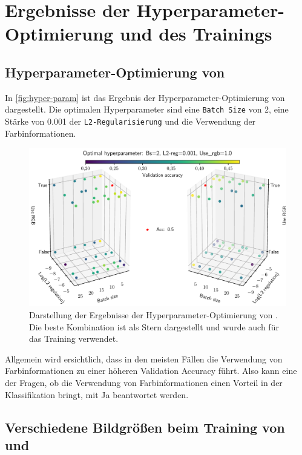 \section{Ergebnisse der Hyperparameter-Optimierung und des Trainings}
\subsection{Hyperparameter-Optimierung von \MiniDog}

In \autoref{fig:hyper-param} ist das Ergebnis der Hyperparameter-Optimierung von \MiniDog
dargestellt. Die optimalen Hyperparameter sind eine \texttt{Batch Size} von 2,
eine Stärke von 0.001 der \texttt{L2-Regularisierung} und die Verwendung
der Farbinformationen.

\begin{figure}
  \centering
  \includegraphics[width=\textwidth]{pics/ergebnisse/hyper_raum.pdf}
  \caption{Darstellung der Ergebnisse der Hyperparameter-Optimierung
  von \MiniDog. Die beste Kombination ist als Stern dargestellt und wurde auch
  für das Training verwendet.}
  \label{fig:hyper-param}
\end{figure}

Allgemein wird ersichtlich, dass in den meisten Fällen die Verwendung von Farbinformationen
zu einer höheren Validation Accuracy führt. Also kann eine der Fragen, ob die Verwendung
von Farbinformationen einen Vorteil in der Klassifikation bringt, mit Ja beantwortet werden.

\subsection{Verschiedene Bildgrößen beim  Training von \PreDog und \PreBig}

